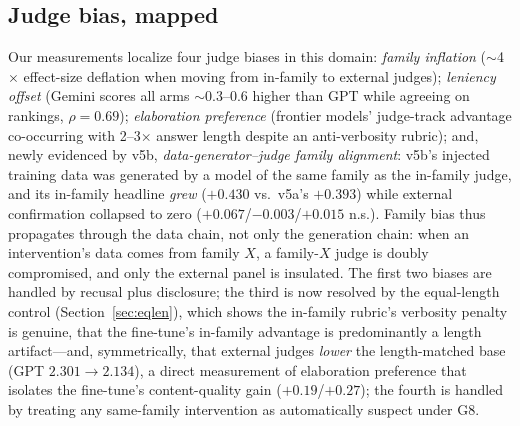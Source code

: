 \documentclass[11pt]{article}
\begin{document}
\subsection{Judge bias, mapped}
Our measurements localize four judge biases in this domain:
\emph{family inflation} ($\sim$4$\times$ effect-size deflation when
moving from in-family to external judges);
\emph{leniency offset} (Gemini scores all arms $\sim$0.3--0.6 higher
than GPT while agreeing on rankings, $\rho{=}0.69$);
\emph{elaboration preference} (frontier models' judge-track advantage
co-occurring with 2--3$\times$ answer length despite an anti-verbosity
rubric); and, newly evidenced by v5b, \emph{data-generator--judge
family alignment}: v5b's injected training data was generated by a
model of the same family as the in-family judge, and its in-family
headline \emph{grew} ($+0.430$ vs.\ v5a's $+0.393$) while external
confirmation collapsed to zero ($+0.067$/$-0.003$/$+0.015$ n.s.).
Family bias thus propagates through the data chain, not only the
generation chain: when an intervention's data comes from family $X$, a
family-$X$ judge is doubly compromised, and only the external panel is
insulated. The first two biases are handled by recusal plus disclosure;
the third is now resolved by the equal-length control
(Section~\ref{sec:eqlen}), which shows the in-family rubric's
verbosity penalty is genuine, that the fine-tune's in-family
advantage is predominantly a length artifact---and, symmetrically,
that external judges \emph{lower} the length-matched base (GPT
$2.301 \to 2.134$), a direct measurement of elaboration preference
that isolates the fine-tune's content-quality gain
($+0.19$/$+0.27$); the fourth is handled by treating any same-family
intervention as automatically suspect under G8.
\end{document}
